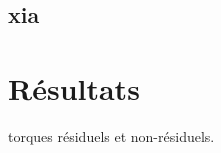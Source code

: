         \section{xia}
        

    \chapter{Résultats}



torques résiduels et non-résiduels.

        

